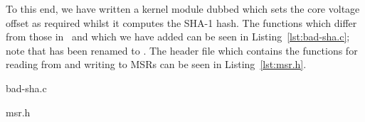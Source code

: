 To this end, we have written a kernel module dubbed  which sets
the core voltage offset as required whilst it computes the SHA-1 hash. The 
functions which differ from those in~\cite{gnupgSHA} and which we have added
can be seen in Listing~\ref{lst:bad-sha.c}; note that  has been
renamed to . The header file  which contains
the functions for reading from and writing to MSRs can be seen in
Listing~\ref{lst:msr.h}.


    {bad-sha.c}


    {msr.h}
